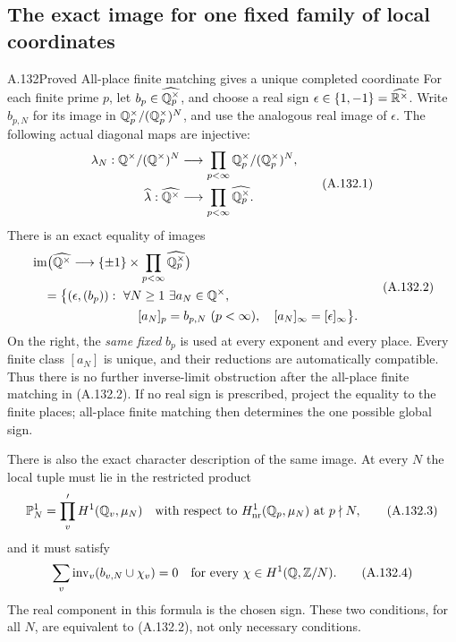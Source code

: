\subsection{The exact image for one fixed family of local coordinates}

\begin{statement}{A.132}{Proved}
{All-place finite matching gives a unique completed coordinate}
For each finite prime \(p\), let
\(b_p\in\widehat{\mathbb Q_p^\times}\), and choose a real sign
\(\epsilon\in\{1,-1\}=\widehat{\mathbb R^\times}\).
Write \(b_{p,N}\) for its image in
\(\mathbb Q_p^\times/(\mathbb Q_p^\times)^N\), and use the analogous
real image of \(\epsilon\).
The following actual diagonal maps are injective:
\[
\begin{aligned}
 \lambda_N:\mathbb Q^\times/(\mathbb Q^\times)^N
   &\longrightarrow\prod_{p<\infty}
                       \mathbb Q_p^\times/(\mathbb Q_p^\times)^N,\\
 \widehat\lambda:\widehat{\mathbb Q^\times}
   &\longrightarrow\prod_{p<\infty}\widehat{\mathbb Q_p^\times}.
\end{aligned}
\tag{A.132.1}
\]
There is an exact equality of images
\[
\begin{aligned}
 &\operatorname{im}\bigl(\widehat{\Q^\times}
       \longrightarrow\{\pm1\}\times
                          \prod_{p<\infty}\widehat{\Q_p^\times}\bigr)\\
 &\quad=\bigl\{(\epsilon,(b_p)):\ \forall N\ge1\ \exists a_N\in\Q^\times,\\
 &\hspace{30mm}[a_N]_p=b_{p,N}\ (p<\infty),\quad
         [a_N]_\infty=[\epsilon]_\infty\bigr\}.
\end{aligned}
\tag{A.132.2}
\]
On the right, the \emph{same fixed} \(b_p\) is used at every
exponent and every place.
Every finite class \([a_N]\) is unique, and their reductions
are automatically compatible.  Thus there is no further
inverse-limit obstruction after the all-place finite
matching in (A.132.2).
If no real sign is prescribed, project the equality to
the finite places; all-place finite matching then determines
the one possible global sign.

There is also the exact character description of the same
image.  At every \(N\) the local tuple must lie in the
restricted product
\[
 {\mathbb P}^1_N=
 \prod_v' H^1(\mathbb Q_v,\mu_N)
       \quad\text{with respect to }H^1_{\rm nr}(\mathbb Q_p,\mu_N)
                      \text{ at }p\nmid N,
\tag{A.132.3}
\]
and it must satisfy
\[
 \sum_v\operatorname{inv}_v(b_{v,N}\cup\chi_v)=0
                  \quad\text{for every }\chi\in H^1(\mathbb Q,\mathbb Z/N).
\tag{A.132.4}
\]
The real component in this formula is the chosen sign.
These two conditions, for all \(N\), are equivalent to
(A.132.2), not only necessary conditions.


\end{statement}
